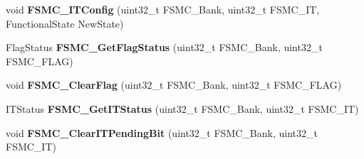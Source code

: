 \begin{DoxyCompactItemize}
\item 
\hypertarget{group__FSMC__Exported__Functions_ga217027ae3cd213b9076b6a1be197064c}{
void {\bfseries FSMC\_\-ITConfig} (uint32\_\-t FSMC\_\-Bank, uint32\_\-t FSMC\_\-IT, FunctionalState NewState)}
\label{group__FSMC__Exported__Functions_ga217027ae3cd213b9076b6a1be197064c}

\item 
\hypertarget{group__FSMC__Exported__Functions_gae00355115b078f483f0771057bb849c4}{
FlagStatus {\bfseries FSMC\_\-GetFlagStatus} (uint32\_\-t FSMC\_\-Bank, uint32\_\-t FSMC\_\-FLAG)}
\label{group__FSMC__Exported__Functions_gae00355115b078f483f0771057bb849c4}

\item 
\hypertarget{group__FSMC__Exported__Functions_ga697618f2de0ad9a8a82461ddbebd5264}{
void {\bfseries FSMC\_\-ClearFlag} (uint32\_\-t FSMC\_\-Bank, uint32\_\-t FSMC\_\-FLAG)}
\label{group__FSMC__Exported__Functions_ga697618f2de0ad9a8a82461ddbebd5264}

\item 
\hypertarget{group__FSMC__Exported__Functions_ga7fce9ca889d33cd8b8b7413875dd4d73}{
ITStatus {\bfseries FSMC\_\-GetITStatus} (uint32\_\-t FSMC\_\-Bank, uint32\_\-t FSMC\_\-IT)}
\label{group__FSMC__Exported__Functions_ga7fce9ca889d33cd8b8b7413875dd4d73}

\item 
\hypertarget{group__FSMC__Exported__Functions_gad9387e7674b8a376256a3378649e004e}{
void {\bfseries FSMC\_\-ClearITPendingBit} (uint32\_\-t FSMC\_\-Bank, uint32\_\-t FSMC\_\-IT)}
\label{group__FSMC__Exported__Functions_gad9387e7674b8a376256a3378649e004e}

\end{DoxyCompactItemize}
